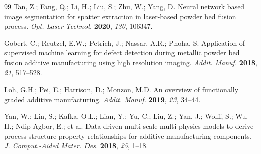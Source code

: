 \begin{thebibliography}{99}
Tan, Z.; Fang, Q.; Li, H.; Liu, S.; Zhu, W.; Yang, D.
Neural network based image segmentation for spatter extraction in laser-based powder bed fusion process.
\textit{Opt. Laser Technol.} \textbf{2020}, \textit{130}, 106347.

Gobert, C.; Reutzel, E.W.; Petrich, J.; Nassar, A.R.; Phoha, S.
Application of supervised machine learning for defect detection during metallic powder bed fusion additive manufacturing using high resolution imaging.
\textit{Addit. Manuf.} \textbf{2018}, \textit{21}, 517--528.

Loh, G.H.; Pei, E.; Harrison, D.; Monzon, M.D.
An overview of functionally graded additive manufacturing.
\textit{Addit. Manuf.} \textbf{2019}, \textit{23}, 34--44.

Yan, W.; Lin, S.; Kafka, O.L.; Lian, Y.; Yu, C.; Liu, Z.; Yan, J.; Wolff, S.; Wu, H.; Ndip-Agbor, E.; et al.
Data-driven multi-scale multi-physics models to derive process-structure-property relationships for additive manufacturing components.
\textit{J. Comput.-Aided Mater. Des.} \textbf{2018}, \textit{25}, 1--18.

\end{thebibliography}
